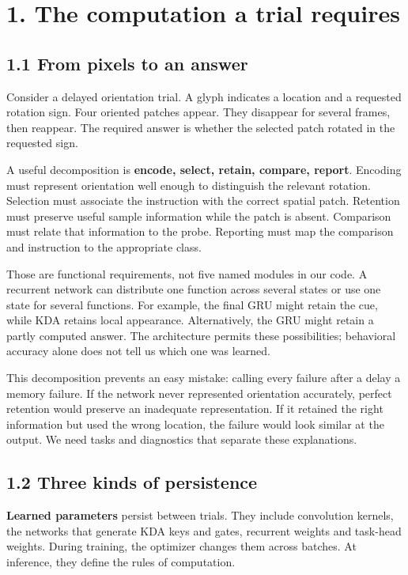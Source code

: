 \documentclass[
  11pt,
]{article}
\let\oldsubsection\subsection
\renewcommand{\subsection}{\Needspace{6\baselineskip}\oldsubsection}
\begin{document}
\newpage

\section{1. The computation a trial
requires}\label{the-computation-a-trial-requires}

\subsection{1.1 From pixels to an
answer}\label{from-pixels-to-an-answer}

Consider a delayed orientation trial. A glyph indicates a location and a
requested rotation sign. Four oriented patches appear. They disappear
for several frames, then reappear. The required answer is whether the
selected patch rotated in the requested sign.

A useful decomposition is \textbf{encode, select, retain, compare,
report}. Encoding must represent orientation well enough to distinguish
the relevant rotation. Selection must associate the instruction with the
correct spatial patch. Retention must preserve useful sample information
while the patch is absent. Comparison must relate that information to
the probe. Reporting must map the comparison and instruction to the
appropriate class.

Those are functional requirements, not five named modules in our code. A
recurrent network can distribute one function across several states or
use one state for several functions. For example, the final GRU might
retain the cue, while KDA retains local appearance. Alternatively, the
GRU might retain a partly computed answer. The architecture permits
these possibilities; behavioral accuracy alone does not tell us which
one was learned.

This decomposition prevents an easy mistake: calling every failure after
a delay a memory failure. If the network never represented orientation
accurately, perfect retention would preserve an inadequate
representation. If it retained the right information but used the wrong
location, the failure would look similar at the output. We need tasks
and diagnostics that separate these explanations.

\subsection{1.2 Three kinds of
persistence}\label{three-kinds-of-persistence}

\textbf{Learned parameters} persist between trials. They include
convolution kernels, the networks that generate KDA keys and gates,
recurrent weights and task-head weights. During training, the optimizer
changes them across batches. At inference, they define the rules of
computation.
\end{document}
